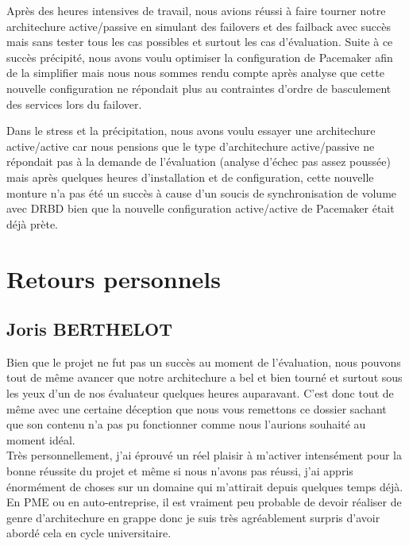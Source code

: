 \documentclass[11pt,a4paper]{report}
\begin{document}
            Apr\`es des heures intensives de travail, nous avions r\'eussi \`a faire tourner notre architechure active/passive en simulant des failovers et des failback avec succ\`es mais sans tester tous les cas possibles et surtout les cas d'\'evaluation. Suite \`a ce succ\`es pr\'ecipit\'e, nous avons voulu optimiser la configuration de Pacemaker afin de la simplifier mais nous nous sommes rendu compte apr\`es analyse que cette nouvelle configuration ne r\'epondait plus au contraintes d'ordre de basculement des services lors du failover.
            
            Dans le stress et la pr\'ecipitation, nous avons voulu essayer une architechure active/active car nous pensions que le type d'architechure active/passive ne r\'epondait pas \`a la demande de l'\'evaluation (analyse d'\'echec pas assez pouss\'ee) mais apr\`es quelques heures d'installation et de configuration, cette nouvelle monture n'a pas \'et\'e un succ\`es \`a cause d'un soucis de synchronisation de volume avec DRBD bien que la nouvelle configuration active/active de Pacemaker \'etait d\'ej\`a pr\`ete.
            
        \section{Retours personnels}
            
            \subsection{Joris \textsc{BERTHELOT}}
                
                Bien que le projet ne fut pas un succ\`es au moment de l'\'evaluation, nous pouvons tout de m\^eme avancer que notre architechure a bel et bien tourn\'e et surtout sous les yeux d'un de nos \'evaluateur quelques heures auparavant. C'est donc tout de m\^eme avec une certaine d\'eception que nous vous remettons ce dossier sachant que son contenu n'a pas pu fonctionner comme nous l'aurions souhait\'e au moment id\'eal.\\
                
                Tr\`es personnellement, j'ai \'eprouv\'e un r\'eel plaisir \`a m'activer intens\'ement pour la bonne r\'eussite du projet et m\^eme si nous n'avons pas r\'eussi, j'ai appris \'enorm\'ement de choses sur un domaine qui m'attirait depuis quelques temps d\'ej\`a. En PME ou en auto-entreprise, il est vraiment peu probable de devoir r\'ealiser de genre d'architechure en grappe donc je suis tr\`es agr\'eablement surpris d'avoir abord\'e cela en cycle universitaire.
                
\end{document}
